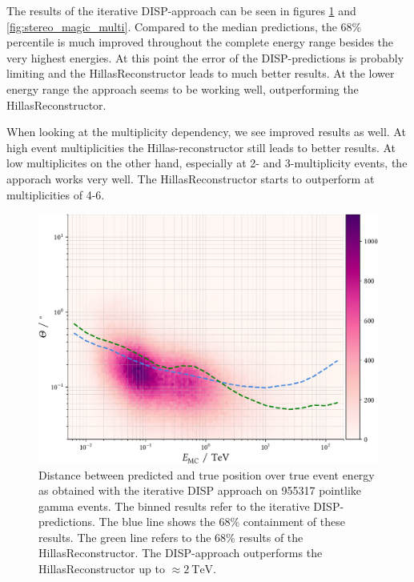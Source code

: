 The results of the iterative DISP-approach can be seen in figures
\ref{fig:stereo_magic_energy} and \ref{fig:stereo_magic_multi}.
Compared to the median predictions, the 68\% percentile is much improved throughout the complete energy range besides 
the very highest energies. At this point the error of the DISP-predictions is probably limiting and the 
HillasReconstructor leads to much better results.
At the lower energy range the approach seems to be working well, outperforming the HillasReconstructor.

When looking at the multiplicity dependency, we see improved results as well. 
At high event multiplicities the Hillas-reconstructor still
leads to better results. At low multiplicites on the other hand,
especially at 2- and 3-multiplicity events, the apporach works very well.
The HillasReconstructor starts to outperform at multiplicities of 4-6.

\begin{figure}
    \centering
    \captionsetup{width=0.9\linewidth}
    \includegraphics[width=0.6\linewidth]{../analysis/plots/gamma/pairwise_median_100_vs_energy.pdf} 
    \caption{Distance between predicted and true position over true event energy as obtained with the
    iterative DISP approach on 955317 pointlike gamma events.
    The binned results refer to the iterative DISP-predictions. The blue line shows the 
    68\% containment of these results. The green line refers to the 68\%
    results of the HillasReconstructor.
    The DISP-approach outperforms the HillasReconstructor up to
    $\approx \SI{2}{\tera\electronvolt}$.}
    \label{fig:stereo_magic_energy}
\end{figure}

